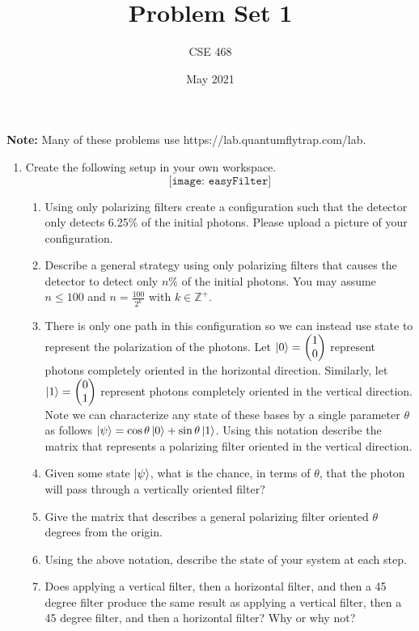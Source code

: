 \documentclass[12pt]{article}
\title{Problem Set 1}
\author{CSE 468}
\date{May 2021}
\begin{document}
\maketitle

\noindent \textbf{Note:} Many of these problems use https://lab.quantumflytrap.com/lab.

\begin{enumerate}[font=\bfseries]
    \item Create the following setup in your own workspace.\\
    \[\texttt{[image: easyFilter]}\]
    \begin{enumerate}
        \item Using only polarizing filters create a configuration such that the detector only detects 6.25$\%$ of the initial photons. Please upload a picture of your configuration.
        \item Describe a general strategy using only polarizing filters that causes the detector to detect only $n\%$ of the initial photons. You may assume $n \leq 100$ and $n = \frac{100}{2^k}$ with $k\in\mathbb{Z}^+$.
        \item There is only one path in this configuration so we can instead use state to represent the polarization of the photons. Let $\ket{0} = \begin{pmatrix}1 \\ 0 \end{pmatrix}$ represent photons completely oriented in the horizontal direction. Similarly, let $\ket{1} = \begin{pmatrix}0 \\ 1 \end{pmatrix}$ represent photons completely oriented in the vertical direction. Note we can characterize any state of these bases by a single parameter $\theta$ as follows $\ket{\psi} = \cos{\theta}\ket{0} + \sin{\theta}\ket{1}$. Using this notation describe the matrix that represents a polarizing filter oriented in the vertical direction.
        \item Given some state $\ket{\psi}$, what is the chance, in terms of $\theta$, that the photon will pass through a vertically oriented filter?
        \item Give the matrix that describes a general polarizing filter oriented $\theta$ degrees from the origin.
        \item Using the above notation, describe the state of your system at each step.
        \item Does applying a vertical filter, then a horizontal filter, and then a 45 degree filter produce the same result as applying a vertical filter, then a 45 degree filter, and then a horizontal filter? Why or why not?

\end{enumerate}
\end{enumerate}
\end{document}
